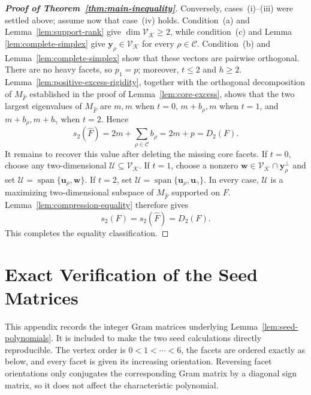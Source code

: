 \documentclass[11pt]{article}
\newcommand{\Span}{\operatorname{span}}
\newcommand{\calC}{\mathcal{C}}
\newcommand{\calK}{\mathcal{K}}
\newcommand{\scrU}{\mathscr{U}}
\newcommand{\scrV}{\mathscr{V}}
\begin{document}
\begin{proof}[\textup{\textbf{Proof of Theorem~\ref{thm:main-inequality}}}]
Conversely, cases~\textup{(i)}--\textup{(iii)} were settled above;
assume now that case~\textup{(iv)} holds.  Condition~\textup{(a)} and  Lemma~\ref{lem:support-rank}   give \(\dim\scrV_{\calK}\geq2\), while condition~\textup{(c)} and Lemma \ref{lem:complete-simplex} give \(\mathbf y_\rho\in\scrV_{\calK}\) for every \(\rho\in\calC\). Condition~\textup{(b)} and
Lemma~\ref{lem:complete-simplex} show that these vectors are pairwise
orthogonal. There are no heavy facets, so \(p_1=p\); moreover, \(t\leq2\) and \(h\geq2\). Lemma~\ref{lem:positive-excess-rigidity}, together with the orthogonal
decomposition of \(M_{\widehat F}\) established in the proof of
Lemma~\ref{lem:core-excess}, shows that the two largest eigenvalues of
\(M_{\widehat F}\) are \(m,m\) when \(t=0\),
\(m+b_\rho,m\) when \(t=1\), and
\(m+b_\rho,m+b_\gamma\) when \(t=2\).  Hence
\[
s_2(\widehat F)=2m+\sum_{\rho\in\calC}b_\rho=2m+p=D_2(F).
\]
It remains to recover this value after deleting the missing core facets. If \(t=0\), choose any two-dimensional \(\scrU\subseteq\scrV_{\calK}\). If \(t=1\), choose a nonzero \(\mathbf w\in\scrV_{\calK}\cap\mathbf y_\rho^\perp\) and set \(\scrU=\Span\{\mathbf u_\rho,\mathbf w\}\). If \(t=2\), set \(\scrU=\Span\{\mathbf u_\rho,\mathbf u_\gamma\}\). In every case, \(\scrU\) is a maximizing two-dimensional subspace of \(M_{\widehat F}\) supported on \(F\). Lemma~\ref{lem:compression-equality} therefore gives
\[
s_2(F)=s_2(\widehat F)=D_2(F).
\]
This completes the equality classification.
\end{proof}
	
	

	\appendix
	\section{Exact Verification of the Seed Matrices}
	\label{app:seed-verification}
	
	This appendix records the integer Gram matrices underlying
	Lemma~\ref{lem:seed-polynomials}.  It is included to make the two seed
	calculations directly reproducible.  The vertex order is
	\(0<1<\cdots<6\), the facets are ordered exactly as below, and every facet
	is given its increasing orientation.  Reversing facet orientations only
	conjugates the corresponding Gram matrix by a diagonal sign matrix, so it
	does not affect the characteristic polynomial.
	
\end{document}
